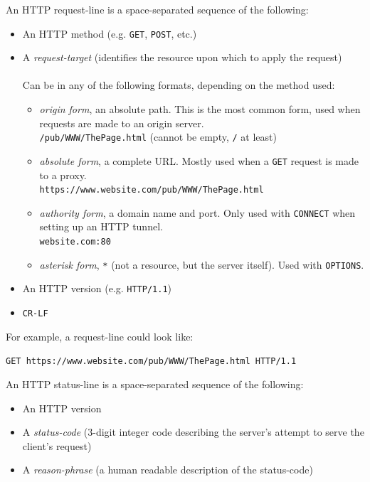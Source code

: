 \documentclass[12pt, titlepage]{article}
\begin{document}
An HTTP request-line is a space-separated sequence of the following:
\begin{itemize}
  \item An HTTP method (e.g. \texttt{GET}, \texttt{POST}, etc.)
  \item A \textit{request-target} (identifies the resource upon which to apply the request) \\\\
  Can be in any of the following formats, depending on the method used:
    \begin{itemize}
      \item \textit{origin form}, an absolute path. This is the most common form, used when requests are made to an origin server. \medskip \\
        \phantom{MM}\texttt{/pub/WWW/ThePage.html} (cannot be empty, \texttt{/} at least)
      \item \textit{absolute form}, a complete URL. Mostly used when a \texttt{GET} request is made to a proxy. \medskip \\
        \phantom{MM}\texttt{https://www.website.com/pub/WWW/ThePage.html}
      \item \textit{authority form}, a domain name and port. Only used with \texttt{CONNECT} when setting up an HTTP tunnel. \medskip \\
        \phantom{MM}\texttt{website.com:80}
      \item \textit{asterisk form}, \texttt{*} (not a resource, but the server itself). Used with \texttt{OPTIONS}.
    \end{itemize}
  \item An HTTP version (e.g. \texttt{HTTP/1.1})
  \item \texttt{CR-LF}
\end{itemize}

For example, a request-line could look like:
\begin{center}
\texttt{GET https://www.website.com/pub/WWW/ThePage.html HTTP/1.1}
\end{center}

An HTTP status-line is a space-separated sequence of the following:
\begin{itemize}
  \item An HTTP version
  \item A \textit{status-code} (3-digit integer code describing the server's attempt to serve the client's request)
  \item A \textit{reason-phrase} (a human readable description of the status-code)
\end{itemize}
\end{document}
